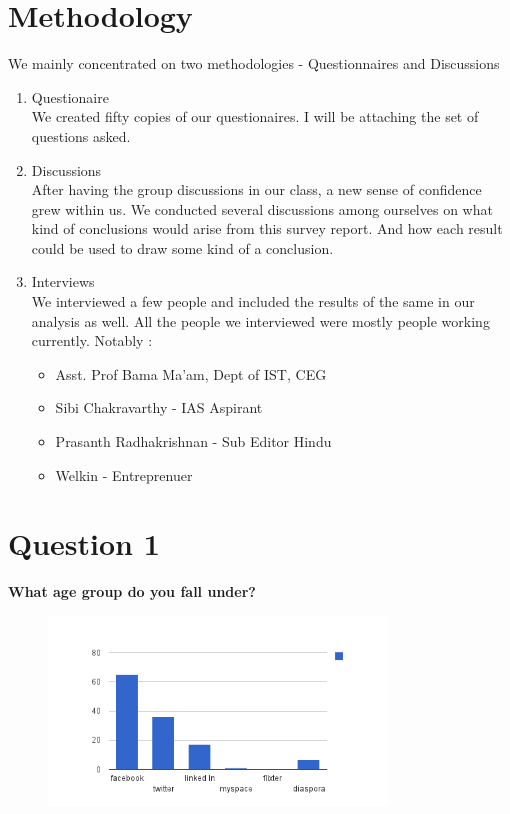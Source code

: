 \documentclass[11pt]{book}
\begin{document}
\chapter{Methodology}
We mainly concentrated on two methodologies - Questionnaires and Discussions
\begin{enumerate}
	\item Questionaire \\We created fifty copies of our questionaires. I will be attaching the set of questions asked. 
	\item Discussions \\After having the group discussions in our class, a new sense of confidence grew within us. 
		We conducted several discussions among ourselves on what kind of conclusions would arise from this survey report. 
		And how each result could be used to draw some kind of a conclusion. 
	\item Interviews \\We interviewed a few people and included the results of the same in our analysis as well. 
		All the people we interviewed were mostly people working currently. Notably : 
		\begin{itemize}
			\item Asst. Prof Bama Ma'am, Dept of IST, CEG
			\item Sibi Chakravarthy - IAS Aspirant
			\item Prasanth Radhakrishnan - Sub Editor Hindu
			\item Welkin - Entreprenuer
		\end{itemize}
\end {enumerate}
\chapter{Question 1}
\textbf{What age group do you fall under?}
\begin{figure}[ht!]
	\centering
	\includegraphics[width=90mm]{questions/1.png}
	\label{overflow}
\end{figure}
\end{document}
